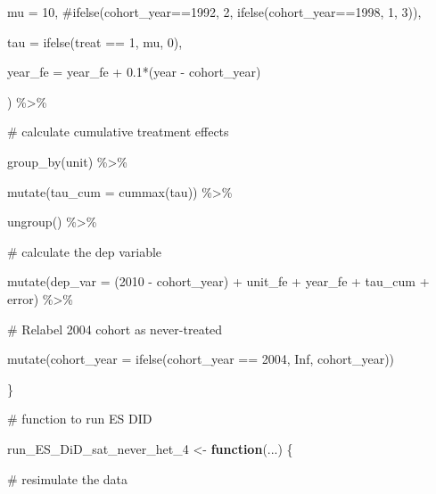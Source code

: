 \documentclass[
  letterpaper,
  DIV=11,
  numbers=noendperiod]{scrartcl}
\newenvironment{Shaded}{\begin{snugshade}}{\end{snugshade}}
\newcommand{\AttributeTok}[1]{\textcolor[rgb]{0.40,0.45,0.13}{#1}}
\newcommand{\CommentTok}[1]{\textcolor[rgb]{0.37,0.37,0.37}{#1}}
\newcommand{\ConstantTok}[1]{\textcolor[rgb]{0.56,0.35,0.01}{#1}}
\newcommand{\ControlFlowTok}[1]{\textcolor[rgb]{0.00,0.23,0.31}{\textbf{#1}}}
\newcommand{\DecValTok}[1]{\textcolor[rgb]{0.68,0.00,0.00}{#1}}
\newcommand{\FloatTok}[1]{\textcolor[rgb]{0.68,0.00,0.00}{#1}}
\newcommand{\FunctionTok}[1]{\textcolor[rgb]{0.28,0.35,0.67}{#1}}
\newcommand{\NormalTok}[1]{\textcolor[rgb]{0.00,0.23,0.31}{#1}}
\newcommand{\OtherTok}[1]{\textcolor[rgb]{0.00,0.23,0.31}{#1}}
\newcommand{\SpecialCharTok}[1]{\textcolor[rgb]{0.37,0.37,0.37}{#1}}
\begin{document}
\begin{Shaded}
\begin{Highlighting}[]
           \AttributeTok{mu =} \DecValTok{10}\NormalTok{, }\CommentTok{\#ifelse(cohort\_year==1992, 2, ifelse(cohort\_year==1998, 1, 3)),}

           \AttributeTok{tau =} \FunctionTok{ifelse}\NormalTok{(treat }\SpecialCharTok{==} \DecValTok{1}\NormalTok{, mu, }\DecValTok{0}\NormalTok{),}

           \AttributeTok{year\_fe =}\NormalTok{ year\_fe }\SpecialCharTok{+} \FloatTok{0.1}\SpecialCharTok{*}\NormalTok{(year }\SpecialCharTok{{-}}\NormalTok{ cohort\_year)}

\NormalTok{    ) }\SpecialCharTok{\%\textgreater{}\%}

    \CommentTok{\# calculate cumulative treatment effects}

    \FunctionTok{group\_by}\NormalTok{(unit) }\SpecialCharTok{\%\textgreater{}\%}

    \FunctionTok{mutate}\NormalTok{(}\AttributeTok{tau\_cum =} \FunctionTok{cummax}\NormalTok{(tau)) }\SpecialCharTok{\%\textgreater{}\%}

    \FunctionTok{ungroup}\NormalTok{() }\SpecialCharTok{\%\textgreater{}\%}

    \CommentTok{\# calculate the dep variable}

    \FunctionTok{mutate}\NormalTok{(}\AttributeTok{dep\_var =}\NormalTok{ (}\DecValTok{2010} \SpecialCharTok{{-}}\NormalTok{ cohort\_year) }\SpecialCharTok{+}\NormalTok{ unit\_fe }\SpecialCharTok{+}\NormalTok{ year\_fe }\SpecialCharTok{+}\NormalTok{ tau\_cum }\SpecialCharTok{+}\NormalTok{ error) }\SpecialCharTok{\%\textgreater{}\%}

    \CommentTok{\# Relabel 2004 cohort as never{-}treated}

    \FunctionTok{mutate}\NormalTok{(}\AttributeTok{cohort\_year =} \FunctionTok{ifelse}\NormalTok{(cohort\_year }\SpecialCharTok{==} \DecValTok{2004}\NormalTok{, }\ConstantTok{Inf}\NormalTok{, cohort\_year))}

 

\NormalTok{\}}

 

 

 

\CommentTok{\# function to run ES DID}

\NormalTok{run\_ES\_DiD\_sat\_never\_het\_4 }\OtherTok{\textless{}{-}} \ControlFlowTok{function}\NormalTok{(...) \{}

 

  \CommentTok{\# resimulate the data}


\end{Highlighting}
\end{Shaded}
\end{document}
